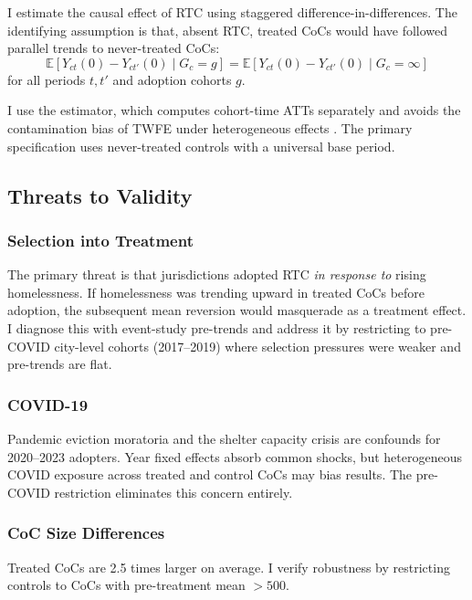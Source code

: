 \documentclass[12pt]{article}
\newcommand{\E}{\mathbb{E}}
\begin{document}
I estimate the causal effect of RTC using staggered difference-in-differences. The identifying assumption is that, absent RTC, treated CoCs would have followed parallel trends to never-treated CoCs:
\begin{equation}
\E[Y_{ct}(0) - Y_{ct'}(0) \mid G_c = g] = \E[Y_{ct}(0) - Y_{ct'}(0) \mid G_c = \infty]
\end{equation}
for all periods $t, t'$ and adoption cohorts $g$.

I use the \citet{callaway2021} estimator, which computes cohort-time ATTs separately and avoids the contamination bias of TWFE under heterogeneous effects \citep{goodmanbacon2021, dechaisemartin2020, sun2021}. The primary specification uses never-treated controls with a universal base period.

\subsection{Threats to Validity}

\subsubsection*{Selection into Treatment} The primary threat is that jurisdictions adopted RTC \textit{in response to} rising homelessness. If homelessness was trending upward in treated CoCs before adoption, the subsequent mean reversion would masquerade as a treatment effect. I diagnose this with event-study pre-trends and address it by restricting to pre-COVID city-level cohorts (2017--2019) where selection pressures were weaker and pre-trends are flat.

\subsubsection*{COVID-19} Pandemic eviction moratoria and the shelter capacity crisis are confounds for 2020--2023 adopters. Year fixed effects absorb common shocks, but heterogeneous COVID exposure across treated and control CoCs may bias results. The pre-COVID restriction eliminates this concern entirely.

\subsubsection*{CoC Size Differences} Treated CoCs are 2.5 times larger on average. I verify robustness by restricting controls to CoCs with pre-treatment mean $> 500$.
\end{document}
